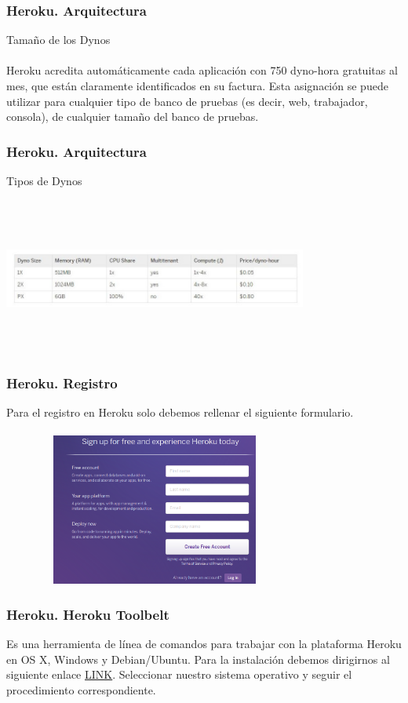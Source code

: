 \documentclass{beamer}
\begin{document}
\begin{frame}
	\frametitle{Heroku. Arquitectura}
	Tamaño de los Dynos\\ \ \\
	Heroku acredita automáticamente cada aplicación con 750 dyno-hora gratuitas al mes, que están claramente identificados en su factura. Esta asignación se puede utilizar para cualquier tipo de banco de pruebas (es decir, web, trabajador, consola), de cualquier tamaño del banco de pruebas. 
	
\end{frame}
\begin{frame}
	\frametitle{Heroku. Arquitectura}
	Tipos de Dynos\\ \ \\
	\includegraphics[width=10cm,height=5cm]{arquitectura/dynoshora.jpg}
	
\end{frame}

\begin{frame}
\frametitle{Heroku. Registro}
Para el registro en Heroku solo debemos rellenar el siguiente formulario.\\ \ \\
\includegraphics[width=10cm, height=5cm]{githubHeroku/22.png}
\end{frame}

\begin{frame}
\frametitle{Heroku. Heroku Toolbelt}
Es una herramienta de línea de comandos para trabajar con la plataforma Heroku en OS X, Windows y Debian/Ubuntu. Para la instalación debemos dirigirnos al siguiente enlace \href{https://toolbelt.heroku.com}{LINK}. Seleccionar nuestro sistema operativo y seguir el procedimiento correspondiente.
\end{frame}
\end{document}
